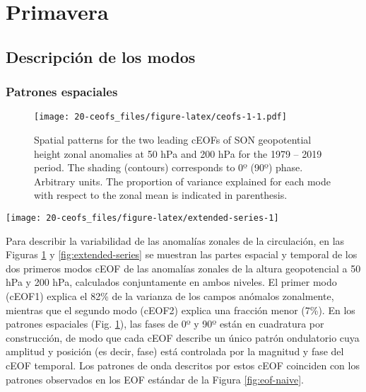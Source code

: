 \documentclass[12pt,oneside]{reedthesis}
\begin{document}
\hypertarget{primavera}{%
\section{Primavera}\label{primavera}}

\hypertarget{descripciuxf3n-de-los-modos}{%
\subsection{Descripción de los modos}\label{descripciuxf3n-de-los-modos}}

\hypertarget{espaciales}{%
\subsubsection{Patrones espaciales}\label{espaciales}}


\begin{figure}
\centering
\texttt{[image: 20-ceofs\_files/figure-latex/ceofs-1-1.pdf]}
\caption{\label{fig:ceofs-1}Spatial patterns for the two leading cEOFs of SON geopotential height zonal anomalies at 50 hPa and 200 hPa for the 1979 -- 2019 period. The shading (contours) corresponds to 0º (90º) phase. Arbitrary units. The proportion of variance explained for each mode with respect to the zonal mean is indicated in parenthesis.}
\end{figure}

\begin{figure*}
\texttt{[image: 20-ceofs\_files/figure-latex/extended-series-1]} \caption{Time series of the two leading cEOFs of SON geopotential height zonal anomalies at 50 hPa and 200 hPa. cEOF1 (row a) and cEOF2 (row b) separated in their 0º (column 1) and 90º (column 2) phase. Dark straight line is the linear trend. Black horizontal and vertical line mark the mean value and range of each time series, respectively.}\label{fig:extended-series}
\end{figure*}
Para describir la variabilidad de las anomalías zonales de la circulación, en las Figuras \ref{fig:ceofs-1} y \ref{fig:extended-series} se muestran las partes espacial y temporal de los dos primeros modos cEOF de las anomalías zonales de la altura geopotencial a 50 hPa y 200 hPa, calculados conjuntamente en ambos niveles.
El primer modo (cEOF1) explica el 82\% de la varianza de los campos anómalos zonalmente, mientras que el segundo modo (cEOF2) explica una fracción menor (7\%).
En los patrones espaciales (Fig. \ref{fig:ceofs-1}), las fases de 0º y 90º están en cuadratura por construcción, de modo que cada cEOF describe un único patrón ondulatorio cuya amplitud y posición (es decir, fase) está controlada por la magnitud y fase del cEOF temporal.
Los patrones de onda descritos por estos cEOF coinciden con los patrones observados en los EOF estándar de la Figura \ref{fig:eof-naive}.
\end{document}
